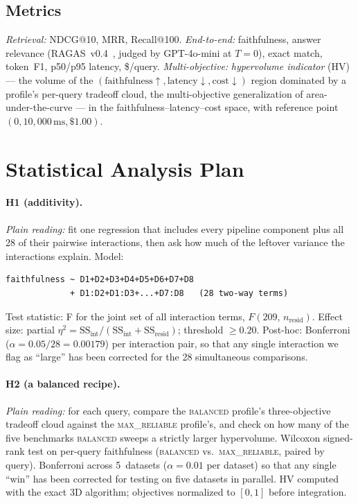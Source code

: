 \documentclass[11pt]{article}
\begin{document}
\subsection{Metrics}

\textit{Retrieval:} NDCG@10, MRR, Recall@100.
\textit{End-to-end:} faithfulness, answer relevance
(RAGAS~v0.4~\citep{es2023ragas}, judged by GPT-4o-mini at $T{=}0$),
exact match, token~F1, p50/p95 latency, \$/query.
\textit{Multi-objective:} \emph{hypervolume indicator} (HV) ---
the volume of the
$(\text{faithfulness}{\uparrow}, \text{latency}{\downarrow}, \text{cost}{\downarrow})$
region dominated by a profile's per-query tradeoff cloud, the
multi-objective generalization of area-under-the-curve --- in the
faithfulness--latency--cost space, with reference point
$(0, 10{,}000\,\text{ms}, \$1.00)$.

\section{Statistical Analysis Plan}
\label{sec:analysis}

\paragraph{H1 (additivity).}
\emph{Plain reading:} fit one regression that includes every
pipeline component plus all 28 of their pairwise interactions, then
ask how much of the leftover variance the interactions explain.
Model:
\begin{small}
\begin{verbatim}
faithfulness ~ D1+D2+D3+D4+D5+D6+D7+D8
             + D1:D2+D1:D3+...+D7:D8   (28 two-way terms)
\end{verbatim}
\end{small}
\vspace{-0.5em}
Test statistic: F for the joint set of all interaction terms,
$F(209,\, n_\text{resid})$.  Effect size: partial
$\eta^2 = \text{SS}_\text{int} / (\text{SS}_\text{int} +
\text{SS}_\text{resid})$; threshold $\geq 0.20$.  Post-hoc:
Bonferroni ($\alpha = 0.05/28 = 0.00179$) per interaction pair, so
that any single interaction we flag as ``large'' has been corrected
for the 28 simultaneous comparisons.

\paragraph{H2 (a balanced recipe).}
\emph{Plain reading:} for each query, compare the
\textsc{balanced} profile's three-objective tradeoff cloud against
the \textsc{max\_reliable} profile's, and check on how many of the
five benchmarks \textsc{balanced} sweeps a strictly larger
hypervolume.  Wilcoxon signed-rank test on per-query faithfulness
(\textsc{balanced} vs.\ \textsc{max\_reliable}, paired by query).
Bonferroni across 5~datasets ($\alpha = 0.01$ per dataset) so that
any single ``win'' has been corrected for testing on five datasets
in parallel.  HV computed with the exact 3D algorithm; objectives
normalized to $[0,1]$ before integration.
\end{document}
